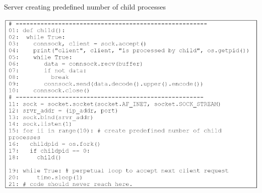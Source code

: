\begin{table}[H]

\vspace{-.3cm}

\centering
\caption{Server creating predefined number of child processes}\label{tab11}
\includegraphics[scale=2.35]{src/Figures/chap1/tab11.jpg}
\end{table}


